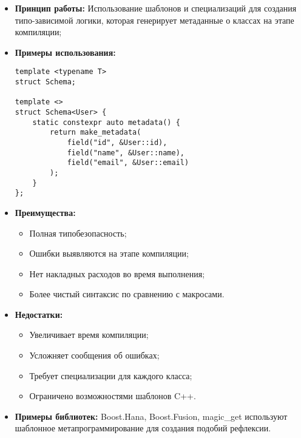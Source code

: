             \begin{itemize}
                \item \textbf{Принцип работы:} Использование шаблонов и специализаций для создания типо-зависимой логики, которая генерирует метаданные о классах на этапе компиляции;
                
                \item \textbf{Примеры использования:} 
                \begin{lstlisting}[style=cpp_style]
template <typename T>
struct Schema;

template <>
struct Schema<User> {
    static constexpr auto metadata() {
        return make_metadata(
            field("id", &User::id),
            field("name", &User::name),
            field("email", &User::email)
        );
    }
};
                \end{lstlisting}
                
                \item \textbf{Преимущества:}
                \begin{itemize}
                    \item Полная типобезопасность;
                    \item Ошибки выявляются на этапе компиляции;
                    \item Нет накладных расходов во время выполнения;
                    \item Более чистый синтаксис по сравнению с макросами.
                \end{itemize}
                
                \item \textbf{Недостатки:}
                \begin{itemize}
                    \item Увеличивает время компиляции;
                    \item Усложняет сообщения об ошибках;
                    \item Требует специализации для каждого класса;
                    \item Ограничено возможностями шаблонов C++.
                \end{itemize}
                
                \item \textbf{Примеры библиотек:} Boost.Hana, Boost.Fusion, magic\_get используют шаблонное метапрограммирование для создания подобий рефлексии.
            \end{itemize}

